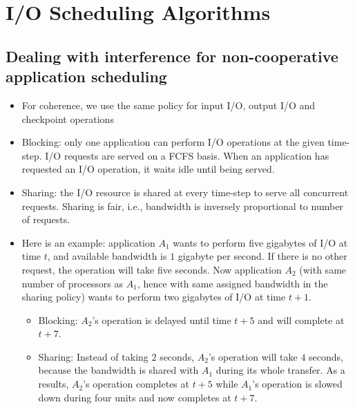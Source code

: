 \section{I/O Scheduling Algorithms}\label{sec:algorithms}

  \subsection{Dealing with interference for non-cooperative application scheduling}
  \begin{itemize}
    \item For coherence, we use the same policy for input I/O, output I/O and checkpoint operations 
    \item Blocking: only one application can perform I/O operations at the given time-step.
    I/O requests are served on a FCFS basis. When an application has requested an I/O
    operation, it waits idle until being served. 
    \item Sharing: the I/O resource is shared at every time-step to serve all concurrent requests. Sharing is fair, i.e., bandwidth is inversely proportional to number of requests.
    \item Here is an example:
    application $A_{1}$ wants to perform five gigabytes of I/O at time $t$,
    and available bandwidth is
    $1$ gigabyte per second. If there is no other request, the operation will take five seconds.
    Now application $A_{2}$ (with same number of processors as $A_{1}$, hence with same assigned bandwidth in the sharing policy) wants to perform two gigabytes of I/O at time $t+1$.
    \begin{itemize}
    \item Blocking: $A_{2}$'s operation is delayed until time $t+5$ and will complete at $t+7$.
    \item Sharing: Instead of taking $2$ seconds, $A_{2}$'s operation will take $4$ seconds, because the bandwidth is shared with $A_{1}$ during its whole transfer. As a results, $A_{2}$'s operation completes at $t+5$ while $A_{1}$'s  operation is slowed down during four units and now completes at $t+7$.
    \end{itemize}
  \end{itemize}





